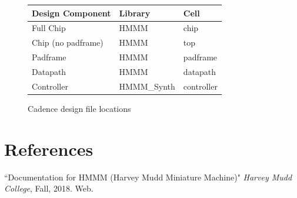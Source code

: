 \documentclass[12pt]{article}
\begin{document}
\begin{figure}[H]
    \begin{center}
    \begin{tabular}{lll}
         Design Component & Library & Cell \\
         \hline
         Full Chip & HMMM & chip \\
         Chip (no padframe) & HMMM & top \\
         Padframe & HMMM & padframe \\
         Datapath & HMMM & datapath \\
         Controller & HMMM\_Synth & controller
    \end{tabular}
    \caption{Cadence design file locations}
    \end{center}
    \label{fig:filelocations}
\end{figure}

\newpage
\section{References}


{\hspace{-0.8cm}
``Documentation for HMMM (Harvey Mudd Miniature Machine)" \emph{Harvey Mudd College}, Fall, 2018. Web.
}
\end{document}
